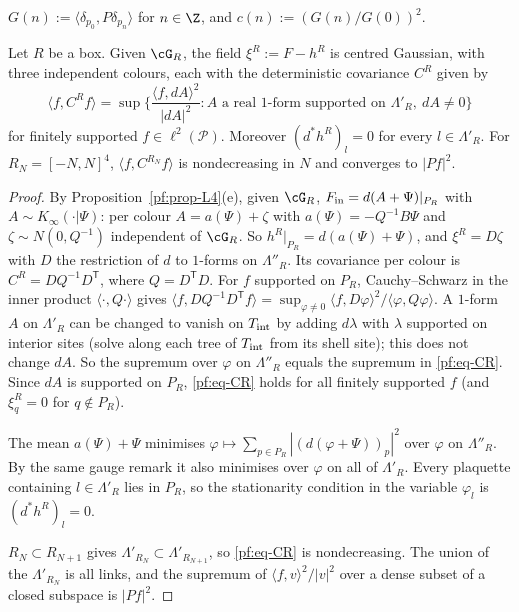 \begin{definition}\label{pf:def-G}
$G(n):=\langle\delta_{p_0},P\delta_{p_n}\rangle$ for $n\in\Z$, and $c(n):=(G(n)/G(0))^2$.
\end{definition}

\begin{lemma}\label{pf:lem-D}
Let $R$ be a box. Given $\cG_R$, the field $\xi^R:=F-h^R$ is centred Gaussian, with three independent colours, each with the deterministic covariance $C^R$ given by
\begin{equation}\label{pf:eq-CR}
\langle f,C^Rf\rangle=\sup\Big\{\frac{\langle f,dA\rangle^2}{|dA|^2}:A\text{ a real }1\text{-form supported on }\Lambda'_R,\ dA\ne0\Big\}
\end{equation}
for finitely supported $f\in\ell^2(\mathcal P)$. Moreover $(d^*h^R)_l=0$ for every $l\in\Lambda'_R$. For $R_N=[-N,N]^4$, $\langle f,C^{R_N}f\rangle$ is nondecreasing in $N$ and converges to $|Pf|^2$.
\end{lemma}

\begin{proof}
By Proposition~\ref{pf:prop-L4}(e), given $\cG_R$, $F_{\rm in}=d(A+\Psi)|_{P_R}$ with $A\sim K_\infty(\cdot|\Psi)$: per colour $A=a(\Psi)+\zeta$ with $a(\Psi)=-Q^{-1}B\Psi$ and $\zeta\sim N(0,Q^{-1})$ independent of $\cG_R$. So $h^R|_{P_R}=d(a(\Psi)+\Psi)$, and $\xi^R=D\zeta$ with $D$ the restriction of $d$ to $1$-forms on $\Lambda''_R$. Its covariance per colour is $C^R=DQ^{-1}D^{\mathsf T}$, where $Q=D^{\mathsf T}D$. For $f$ supported on $P_R$, Cauchy--Schwarz in the inner product $\langle\cdot,Q\cdot\rangle$ gives
$\langle f,DQ^{-1}D^{\mathsf T}f\rangle=\sup_{\varphi\ne0}\langle f,D\varphi\rangle^2/\langle\varphi,Q\varphi\rangle$. A $1$-form $A$ on $\Lambda'_R$ can be changed to vanish on $T_{\rm int}$ by adding $d\lambda$ with $\lambda$ supported on interior sites (solve along each tree of $T_{\rm int}$ from its shell site); this does not change $dA$. So the supremum over $\varphi$ on $\Lambda''_R$ equals the supremum in \eqref{pf:eq-CR}. Since $dA$ is supported on $P_R$, \eqref{pf:eq-CR} holds for all finitely supported $f$ (and $\xi^R_q=0$ for $q\notin P_R$).

The mean $a(\Psi)+\Psi$ minimises $\varphi\mapsto\sum_{p\in P_R}|(d(\varphi+\Psi))_p|^2$ over $\varphi$ on $\Lambda''_R$. By the same gauge remark it also minimises over $\varphi$ on all of $\Lambda'_R$. Every plaquette containing $l\in\Lambda'_R$ lies in $P_R$, so the stationarity condition in the variable $\varphi_l$ is $(d^*h^R)_l=0$.

$R_N\subset R_{N+1}$ gives $\Lambda'_{R_N}\subset\Lambda'_{R_{N+1}}$, so \eqref{pf:eq-CR} is nondecreasing. The union of the $\Lambda'_{R_N}$ is all links, and the supremum of $\langle f,v\rangle^2/|v|^2$ over a dense subset of a closed subspace is $|Pf|^2$.
\end{proof}

